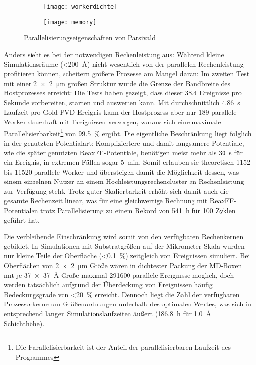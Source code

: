 \begin{figure}[hb]
  \centering
  \captionsetup[subfigure]{singlelinecheck=false}
  \def\subfigwidth{7cm}
  \begin{subfigure}[t]{\subfigwidth}
    \texttt{[image: workerdichte]}
    \label{fig:goldscala-a}
  \end{subfigure}
  \hfill
  \begin{subfigure}[t]{\subfigwidth}
    \texttt{[image: memory]}
    \label{fig:goldscala-b}
  \end{subfigure}
  \caption{Parallelisierungseigenschaften von Parsivald}
  \label{fig:goldscala}
\end{figure}

Anders sieht es bei der notwendigen Rechenleistung aus:
Während kleine Simulationsräume (\SI{<200}{\angstrom}) nicht wesentlich von der parallelen Rechenleistung profitieren können, scheitern größere Prozesse am Mangel daran:
Im zweiten Test mit einer \SI{2x2}{\micro\meter} großen Struktur wurde die Grenze der Bandbreite des Hostprozesses erreicht:
Die Tests haben gezeigt, dass dieser \num{38.4} Ereignisse pro Sekunde vorbereiten, starten und auswerten kann.
Mit durchschnittlich \SI{4.86}{\second} Laufzeit pro Gold-PVD-Ereignis kann der Hostprozess aber nur 189 parallele Worker dauerhaft mit Ereignissen versorgen, woraus sich eine maximale Parallelisierbarkeit\footnote{Die Parallelisierbarkeit ist der Anteil der parallelisierbaren Laufzeit des Programmes} von \SI{99.5}{\percent} ergibt.
Die eigentliche Beschränkung liegt folglich in der genutzten Potentialart:
Kompliziertere und damit langsamere Potentiale, wie die später genutzten ReaxFF-Potentiale, benötigen meist mehr als \SI{30}{\second} für ein Ereignis, in extremen Fällen sogar \SI{5}{\minute}.
Somit erlauben sie theoretisch \num{1152} bis \num{11520} parallele Worker und übersteigen damit die Möglichkeit dessen, was einem einzelnen Nutzer an einem Hochleistungsrechencluster an Rechenleistung zur Verfügung steht.
Trotz guter Skalierbarkeit erhöht sich damit auch die gesamte Rechenzeit linear, was für eine gleichwertige Rechnung mit ReaxFF-Potentialen trotz Parallelisierung zu einem Rekord von \SI{541}{\hour} für 100 Zyklen geführt hat.

Die verbleibende Einschränkung wird somit von den verfügbaren Rechenkernen gebildet.
In Simulationen mit Substratgrößen auf der Mikrometer-Skala wurden nur kleine Teile der Oberfläche (\SI{<0.1}{\percent}) zeitgleich von Ereignissen simuliert.
Bei Oberflächen von \SI{2x2}{\micro\meter} Größe wären in dichtester Packung der MD-Boxen mit je \SI{37x37}{\angstrom} Größe maximal \num{291600} parallele Ereignisse möglich, doch werden tatsächlich aufgrund der Überdeckung von Ereignissen häufig Bedeckungsgrade von \SI{<20}{\percent} erreicht.
Dennoch liegt die Zahl der verfügbaren Prozessorkerne um Größenordnungen unterhalb des optimalen Wertes, was sich in entsprechend langen Simulationslaufzeiten äußert (\SI{186.8}{\hour} für \SI{1.0}{\angstrom} Schichthöhe).

